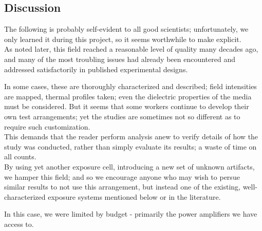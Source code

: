 \documentclass[paper.tex]{subfiles}
\begin{document}
\begin{multicols}{1}
\section{Discussion}





\begin{tcolorbox}
	
	The following is probably self-evident to all good scientists; unfortunately, we only learned it during this project, so it seems worthwhile to make explicit.\\
	
	As noted later, this field reached a reasonable level of quality many decades ago, and many of the most troubling issues had already been encountered and addressed satisfactorily in published experimental designs\cite{Biological1984}. 
	
	In some cases, these are thoroughly characterized and described; field intensities are mapped, thermal profiles taken; even the dielectric properties of the media must be considered. But it seems that some workers continue to develop their own test arrangements; yet the studies are sometimes not so different as to require such customization. \\
	
	This demands that the reader perform analysis anew to verify details of how the study was conducted, rather than simply evaluate its results; a waste of time on all counts.\\
	
	By using yet another exposure cell, introducing a new set of unknown artifacts, we hamper this field; and so we encourage anyone who may wish to persue similar results to not use this arrangement, but instead one of the existing, well-characterized exposure systems mentioned below or in the literature.
	
	In this case, we were limited by budget - primarily the power amplifiers we have access to.
	
\end{tcolorbox}





\end{multicols}
\end{document}
